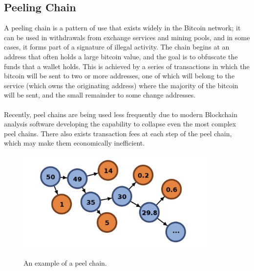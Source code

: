 \subsection{Peeling Chain}\label{background-peeling-chain}
A peeling chain is a pattern of use that exists widely in the Bitcoin network; it can be used in withdrawals from exchange services and mining pools, and in some cases, it forms part of a signature of illegal activity. The chain begins at an address that often holds a large bitcoin value, and the goal is to obfuscate the funds that a wallet holds. This is achieved by a series of transactions in which the bitcoin will be sent to two or more addresses, one of which will belong to the service (which owns the originating address) where the majority of the bitcoin will be sent, and the small remainder to some change addresses. 
\\\\
Recently, peel chains are being used less frequently due to modern Blockchain analysis software developing the capability to collapse even the most complex peel chains. There also exists transaction fees at each step of the peel chain, which may make them economically inefficient. 
\begin{figure}[h!]
  \centering
  \includegraphics[width = 10cm]{./figures/peel-chain}\\[0.5cm] 
  \caption{An example of a peel chain. \cite{RefWorks:doc:5c3db214e4b0854ae6124c26}}
  \label{fig:peel-chain}
\end{figure}


